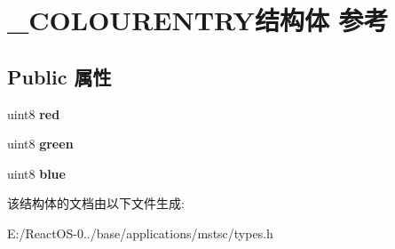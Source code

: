 \hypertarget{struct___c_o_l_o_u_r_e_n_t_r_y}{}\section{\+\_\+\+C\+O\+L\+O\+U\+R\+E\+N\+T\+R\+Y结构体 参考}
\label{struct___c_o_l_o_u_r_e_n_t_r_y}
\subsection*{Public 属性}
\begin{DoxyCompactItemize}
\item 
\mbox{\label{struct___c_o_l_o_u_r_e_n_t_r_y_a683da848f071a287c3490f33c5ec0aac}} 
uint8 {\bfseries red}
\item 
\mbox{\label{struct___c_o_l_o_u_r_e_n_t_r_y_ac9ee9e4d7e4a9cc0fdb884e913ac47fc}} 
uint8 {\bfseries green}
\item 
\mbox{\label{struct___c_o_l_o_u_r_e_n_t_r_y_a81aa4f73c35ec2f6b2b257fba8e5e9e5}} 
uint8 {\bfseries blue}
\end{DoxyCompactItemize}


该结构体的文档由以下文件生成\+:\begin{DoxyCompactItemize}
\item 
E\+:/\+React\+O\+S-\/0../base/applications/mstsc/types.\+h\end{DoxyCompactItemize}

